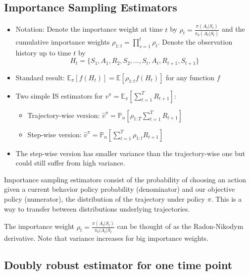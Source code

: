 \documentclass[11pt]{article}
\def\EE{\mathbb{E}}
\def\PP{\mathbb{P}}
\begin{document}
\subsection{Importance Sampling Estimators}
\begin{itemize}
\item Notation: Denote the importance weight at time $t$ by $\rho_t = \frac{\pi(A_t|S_t)}{\pi_b(A_t|S_t)}$ and the cumulative importance weights  $\rho_{1:t} = \prod_{s=1}^{t}\rho_t$. Denote the observation history up to time $t$ by $$H_t = \{S_1, A_1, R_2, S_2, \dots, S_{t}, A_{t}, R_{t+1}, S_{t+1} \}$$
  
\item Standard result: $\EE_\pi[f(H_t)] = \EE[\rho_{1:t} f(H_t)]$ for any function $f$
  
\item Two simple IS estimators for $v^\pi = \EE_\pi\left[\sum_{t=1}^{T} R_{t+1}\right]$:
  \begin{itemize}
  \item Trajectory-wise version: $\hat v^{\pi} = \PP_n\left[\rho_{1:T} \sum_{t=1}^{T} R_{t+1}\right]$
  \item Step-wise version: $\hat v^{\pi} = \PP_n\left[\sum_{t=1}^{T} \rho_{1:t} R_{t+1}\right]$			
  \end{itemize}
\item The step-wise version has smaller variance than the trajectory-wise one but could still suffer from high variance. 
\end{itemize}

Importance sampling estimators consist of the probability of choosing an action given a current behavior policy probability (denominator) and our objective policy (numerator), the distribution of the trajectory under policy $\pi$. This is a way to transfer between distributions underlying trajectories.

The importance weight $\rho_t = \frac{\pi(A_t|S_t)}{\pi_b(A_t|S_t}$ can be thought of as the Radon-Nikodym derivative. Note that variance increases for big importance weights.

\subsection{Doubly robust estimator for one time point}
\end{document}

